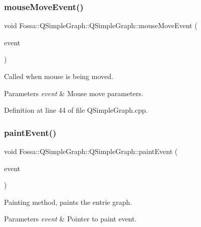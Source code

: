 \subsubsection{\texorpdfstring{mouse\+Move\+Event()}{mouseMoveEvent()}}
{\footnotesize\ttfamily void Fossa\+::\+Q\+Simple\+Graph\+::\+Q\+Simple\+Graph\+::mouse\+Move\+Event (\begin{DoxyParamCaption}\item[{Q\+Mouse\+Event $\ast$}]{event }\end{DoxyParamCaption})\hspace{0.3cm}{\ttfamily [protected]}}



Called when mouse is being moved. 


\begin{DoxyParams}{Parameters}
{\em event} & Mouse move parameters. \\
\hline
\end{DoxyParams}


Definition at line 44 of file Q\+Simple\+Graph.\+cpp.

\mbox{\label{class_fossa_1_1_q_simple_graph_1_1_q_simple_graph_a6559739099820e1303c1dbe2c5757bc4}} 
\subsubsection{\texorpdfstring{paint\+Event()}{paintEvent()}}
{\footnotesize\ttfamily void Fossa\+::\+Q\+Simple\+Graph\+::\+Q\+Simple\+Graph\+::paint\+Event (\begin{DoxyParamCaption}\item[{Q\+Paint\+Event $\ast$}]{event }\end{DoxyParamCaption})\hspace{0.3cm}{\ttfamily [protected]}}



Painting method, paints the entrie graph. 


\begin{DoxyParams}{Parameters}
{\em event} & Pointer to paint event. \\
\hline
\end{DoxyParams}


